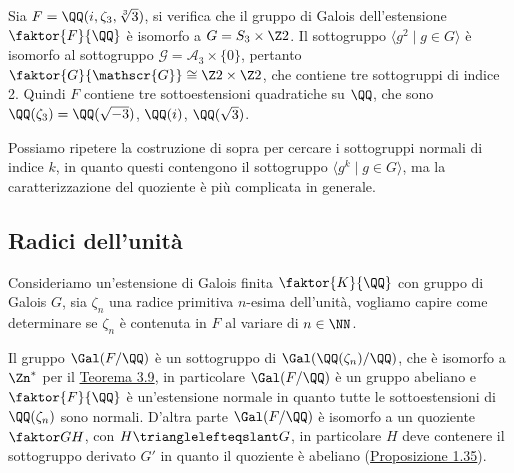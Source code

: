 \documentclass[11pt]{scrartcl}
\begin{document}
\begin{example}
    Sia $F = \QQ(i, \zeta_3, \sqrt[3]3)$, si verifica che il gruppo di Galois
    dell'estensione $\faktor{F}{\QQ}$ è isomorfo a $G = S_3\times\Z2$.
    Il sottogruppo $\langle g^2 \mid g \in G\rangle$ è isomorfo al sottogruppo
    $\mathscr{G} = \mathcal{A}_3 \times \{0\}$, pertanto $\faktor{G}{\mathscr{G}}
    \cong \Z2\times\Z2$, che contiene tre sottogruppi di indice 2. Quindi 
    $F$ contiene tre sottoestensioni quadratiche su $\QQ$, che sono 
    $\QQ(\zeta_3) = \QQ(\sqrt{-3})$, $\QQ(i)$, $\QQ(\sqrt 3)$.
\end{example}

\begin{remark}
    Possiamo ripetere la costruzione di sopra per cercare i sottogruppi 
    normali di indice $k$, in quanto questi contengono il sottogruppo
    $\langle g^k \mid g \in G\rangle$, ma la caratterizzazione del quoziente
    è più complicata in generale.
\end{remark}

\newpage

\subsection{Radici dell'unità}

Consideriamo un'estensione di Galois finita $\faktor{K}{\QQ}$ con gruppo di 
Galois $G$, sia $\zeta_n$ una radice primitiva $n$-esima dell'unità, vogliamo
capire come determinare se $\zeta_n$ è contenuta in $F$ al variare di $n \in \NN$.

\begin{center}
\end{center}

Il gruppo $\Gal(F/\QQ)$ è un sottogruppo di $\Gal(\QQ(\zeta_n)/\QQ)$, che è
isomorfo a $\Zn^*$ per il \hyperref[teorema3.9]{Teorema 3.9}, in particolare
$\Gal(F/\QQ)$ è un gruppo abeliano e $\faktor{F}{\QQ}$ è un'estensione normale
in quanto tutte le sottoestensioni di $\QQ(\zeta_n)$ sono normali. D'altra 
parte $\Gal(F/\QQ)$ è isomorfo a un quoziente $\faktor G H$, con $H \trianglelefteqslant G$,
in particolare $H$ deve contenere il sottogruppo derivato $G'$ in quanto
il quoziente è abeliano (\hyperref[prop1.35]{Proposizione 1.35}).
\end{document}

